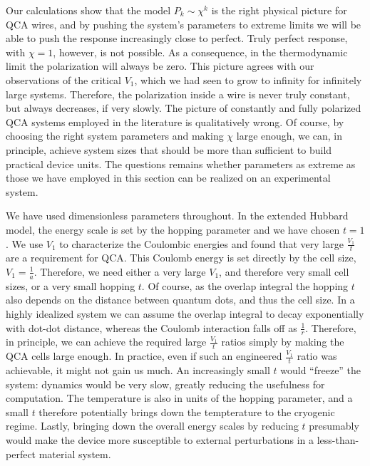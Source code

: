 Our calculations show that the model $P_k \sim \chi^k$ is the right physical
picture for QCA wires, and by pushing the system's parameters to extreme limits
we will be able to push the response increasingly close to perfect. Truly
perfect response, with $\chi = 1$, however, is not possible. As a consequence, in the
thermodynamic limit the polarization will always be zero. This picture agrees
with our observations of the critical $V_1$, which we had seen to grow to
infinity for infinitely large systems. Therefore, the polarization inside a wire
is never truly constant, but always decreases, if very slowly. The picture of
constantly and fully polarized QCA systems employed in the literature is
qualitatively wrong. Of course, by choosing the right system parameters and
making $\chi$ large enough, we can, in principle, achieve system sizes that
should be more than sufficient to build practical device units. The questions
remains whether parameters as extreme as those we have employed in this
section can be realized on an experimental system.

We have used dimensionless parameters throughout. In the extended Hubbard model,
the energy scale is set by the hopping parameter and we have chosen $t = 1$. We
use $V_1$ to characterize the Coulombic energies and found that very large
$\frac{V_1}{t}$ are a requirement for QCA. This Coulomb energy is set directly
by the cell size, $V_1 = \frac{1}{a}$. Therefore, we need either a very large
$V_1$, and therefore very small cell sizes, or a very small hopping $t$. Of
course, as the overlap integral the hopping $t$ also depends on the distance
between quantum dots, and thus the cell size. In a highly idealized system we
can assume the overlap integral to decay exponentially with dot-dot distance,
whereas the Coulomb interaction falls off as $\frac{1}{r}$. Therefore, in
principle, we can achieve the required large $\frac{V_1}{t}$ ratios simply by
making the QCA cells large enough. In practice, even if such an engineered
$\frac{V_1}{t}$ ratio was achievable, it might not gain us much. An increasingly
small $t$ would ``freeze'' the system: dynamics would be very slow, greatly
reducing the usefulness for computation. The temperature is also in units of the
hopping parameter, and a small $t$ therefore potentially brings down the
tempterature to the cryogenic regime. Lastly, bringing down the overall energy
scales by reducing $t$ presumably would make the device more susceptible to
external perturbations in a less-than-perfect material system.

